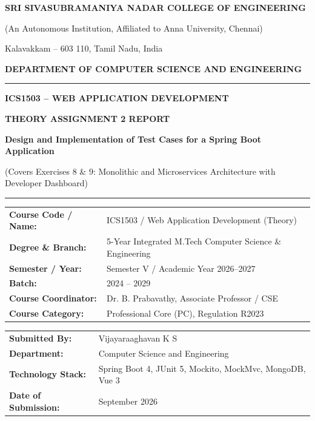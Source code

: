 \documentclass[12pt,a4paper]{article}
\begin{document}
\begin{titlepage}
  \centering
  \vspace*{0.5cm}
  {\large\bfseries SRI SIVASUBRAMANIYA NADAR COLLEGE OF ENGINEERING\par}
  {\small (An Autonomous Institution, Affiliated to Anna University, Chennai)\par}
  {\small Kalavakkam -- 603 110, Tamil Nadu, India\par}
  \vspace{0.4cm}
  {\bfseries DEPARTMENT OF COMPUTER SCIENCE AND ENGINEERING\par}
  \vspace{1.2cm}
  
  \rule{\linewidth}{1pt}\vspace{0.3cm}
  {\Large\bfseries\color{primary} ICS1503 -- WEB APPLICATION DEVELOPMENT\par}
  \vspace{0.2cm}
  {\large\bfseries THEORY ASSIGNMENT 2 REPORT\par}
  \vspace{0.2cm}
  {\normalsize\bfseries Design and Implementation of Test Cases for a Spring Boot Application\par}
  {\footnotesize (Covers Exercises 8 \& 9: Monolithic and Microservices Architecture with Developer Dashboard)\par}
  \vspace{0.3cm}\rule{\linewidth}{1pt}
  
  \vspace{1.8cm}
  
  \begin{tabularx}{0.9\linewidth}{lX}
    \textbf{Course Code / Name:} & ICS1503 / Web Application Development (Theory) \\
    \textbf{Degree \& Branch:}   & 5-Year Integrated M.Tech Computer Science \& Engineering \\
    \textbf{Semester / Year:}    & Semester V / Academic Year 2026--2027 \\
    \textbf{Batch:}              & 2024 -- 2029 \\
    \textbf{Course Coordinator:} & Dr. B. Prabavathy, Associate Professor / CSE \\
    \textbf{Course Category:}    & Professional Core (PC), Regulation R2023 \\
  \end{tabularx}
  
  \vfill
  
  \begin{tabularx}{0.9\linewidth}{lX}
    \textbf{Submitted By:}       & Vijayaraaghavan K S \\
    \textbf{Department:}         & Computer Science and Engineering \\
    \textbf{Technology Stack:}   & Spring Boot 4, JUnit 5, Mockito, MockMvc, MongoDB, Vue 3 \\
    \textbf{Date of Submission:} & September 2026 \\
  \end{tabularx}
\end{titlepage}
\end{document}
